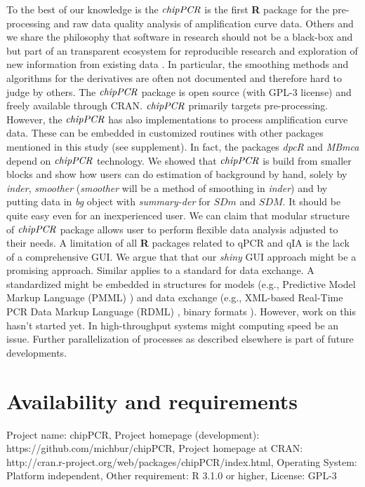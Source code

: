 \documentclass[twocolumn]{bmcart}%
\begin{document}
To the best of our knowledge is the $\emph{chipPCR}$ is the first \textbf{R} 
package for the pre-processing and raw data quality analysis of amplification 
curve data. Others and we share the philosophy that software in research should 
not be a black-box and but part of an transparent ecosystem for reproducible 
research and exploration of new information from existing data 
\cite{roediger_RJ_2013, hofmann_2013, Leeper_2014,Thioulouse_2010,liu_2014}. 
In particular, the smoothing methods and algorithms for the derivatives are 
often not documented and therefore hard to judge by others. The $\emph{chipPCR}$ 
package is open source (with GPL-3 license) and freely available through CRAN. 
$\emph{chipPCR}$ primarily targets pre-processing. However, the $\emph{chipPCR}$ 
has also implementations to process amplification curve data. These can be 
embedded in customized routines with other packages mentioned in this study 
(see supplement). In fact, the packages \emph{dpcR} and \emph{MBmca} depend on 
$\emph{chipPCR}$ technology. We showed that $\emph{chipPCR}$ is build from 
smaller blocks and show how users can do estimation of background by hand, 
solely by \textsl{inder}, \textsl{smoother} (\textsl{smoother} will be a method 
of smoothing in \textsl{inder}) and by putting data in \textsl{bg} object with 
\textsl{summary-der} for $SDm$ and $SDM$. It should be quite easy even for an 
inexperienced user. We can claim that modular structure of $\emph{chipPCR}$ 
package allows user to perform flexible data analysis adjusted to their needs. A 
limitation of all \textbf{R} packages related to qPCR and qIA is the lack of a 
comprehensive GUI. We argue that that our \emph{shiny} GUI approach might be a 
promising approach. Similar applies to a standard for data exchange. A 
standardized might be embedded in structures for models (e.g., Predictive Model 
Markup Language (PMML) \cite{Guazzelli_2009}) and data exchange (e.g., XML-based 
Real-Time PCR Data Markup Language (RDML) 
\cite{blagodatskikh_2014,lefever_2009}, binary formats \cite{michna_2013}). 
However, work on this hasn't started yet. In high-throughput systems might 
computing speed be an issue. Further parallelization of 
processes as described elsewhere \cite{Schmidberger_2009, boehringer_2013} is 
part of future developments. 

\section*{Availability and requirements}
Project name: chipPCR, 
Project homepage (development):
https://github.com/michbur/chipPCR, 
Project homepage at CRAN: 
http://cran.r-project.org/web/packages/chipPCR/index.html, 
Operating System: Platform independent, 
Other requirement: R 3.1.0 or higher, 
License: GPL-3
\end{document}
